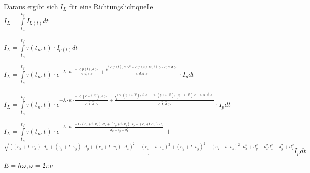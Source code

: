 \documentclass[]{article}
\begin{document}
Daraus ergibt sich $I_L$ für eine Richtungslichtquelle \\

$I_L = \int\limits_{t_n}^{t_f} I_{L(t)} dt $

$I_L = \int\limits_{t_n}^{t_f} \tau(t_n, t) \cdot I_{p(t)} dt$

$I_L = \int\limits_{t_n}^{t_f} \tau(t_n, t) \cdot e^{- \lambda \cdot \kappa \cdot \frac{-<p(t), d>}{<d, d>} + \frac{\sqrt{<p(t), d>^2 - <p(t), p(t)> \cdot <d, d>}}{<d, d>}} \cdot I_p dt$

$I_L = \int\limits_{t_n}^{t_f} \tau(t_n, t) \cdot e^{- \lambda \cdot \kappa \cdot \frac{-<(\underline{e} + t \cdot \vec{v}), \vec{d}>}{<\vec{d}, \vec{d}>} + \frac{\sqrt{<(\underline{e} + t \cdot \vec{v}), \vec{d}>^2 - <(\underline{e} + t \cdot \vec{v}), (\underline{e} + t \cdot \vec{v})> \cdot <\vec{d}, \vec{d}>}}{<\vec{d}, \vec{d}>}} \cdot I_p dt$


$
I_L = \int\limits_{t_n}^{t_f} \tau(t_n, t) \cdot e^{- \lambda \cdot \kappa \cdot \frac{-1 \cdot (e_x + t \cdot v_x) \cdot d_x + 
                     (e_y + t \cdot v_y) \cdot d_y + 
                     (e_z + t \cdot v_z) \cdot d_z}{d_x^2 + d_y^2 + d_z^2}} + $  \\  $
                     \frac{\sqrt{
                     ((e_x + t \cdot v_x) \cdot d_x +
                      (e_y + t \cdot v_y) \cdot d_y +
                      (e_z + t \cdot v_z) \cdot d_z
                     )^2 - 
                     (e_x + t \cdot v_x)^2 +
                     (e_y + t \cdot v_y)^2 +
                     (e_z + t \cdot v_z)^2 \cdot
                     d_x^2 + d_y^2 + d_z^2}{d_x^2 + d_y^2 + d_z^2}} \cdot I_p dt
               $

\vspace*{2cm}

$E = h \omega, \omega = 2 \pi \nu$
\end{document}
